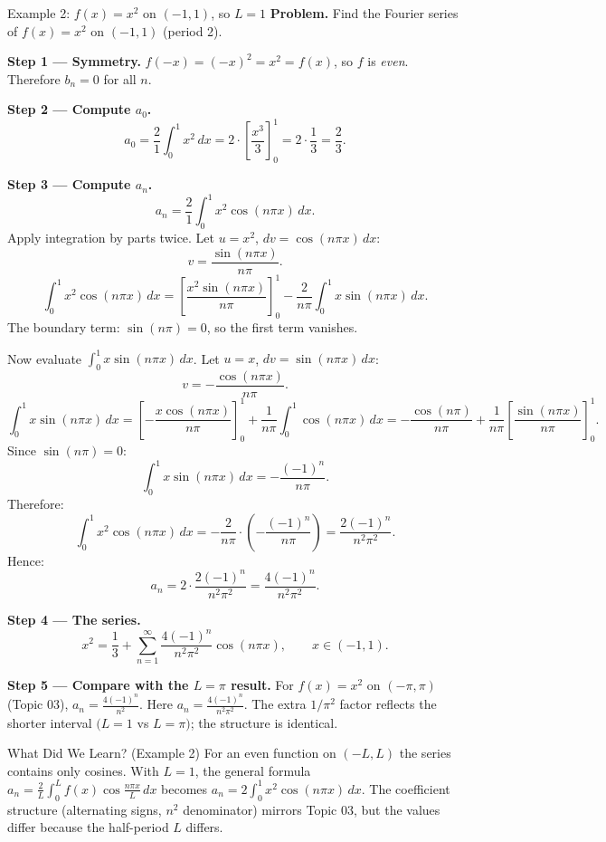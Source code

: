 \documentclass[12pt,a4paper]{article}
\begin{document}
\begin{infobox}{Example 2: $f(x) = x^2$ on $(-1, 1)$, so $L = 1$}
\textbf{Problem.} Find the Fourier series of $f(x) = x^2$ on $(-1, 1)$ (period 2).

\medskip
\textbf{Step 1 --- Symmetry.}
$f(-x) = (-x)^2 = x^2 = f(x)$, so $f$ is \emph{even}.
Therefore $b_n = 0$ for all $n$.

\textbf{Step 2 --- Compute $a_0$.}
\[
a_0 = \frac{2}{1}\int_0^1 x^2\,dx = 2\cdot\left[\frac{x^3}{3}\right]_0^1 = 2\cdot\frac{1}{3} = \frac{2}{3}.
\]

\textbf{Step 3 --- Compute $a_n$.}
\[
a_n = \frac{2}{1}\int_0^1 x^2\cos(n\pi x)\,dx.
\]
Apply integration by parts twice. Let $u = x^2$, $dv = \cos(n\pi x)\,dx$:
\[
v = \frac{\sin(n\pi x)}{n\pi}.
\]
\[
\int_0^1 x^2\cos(n\pi x)\,dx
= \left[\frac{x^2\sin(n\pi x)}{n\pi}\right]_0^1
  - \frac{2}{n\pi}\int_0^1 x\sin(n\pi x)\,dx.
\]
The boundary term: $\sin(n\pi) = 0$, so the first term vanishes.

Now evaluate $\int_0^1 x\sin(n\pi x)\,dx$. Let $u = x$, $dv = \sin(n\pi x)\,dx$:
\[
v = -\frac{\cos(n\pi x)}{n\pi}.
\]
\[
\int_0^1 x\sin(n\pi x)\,dx
= \left[-\frac{x\cos(n\pi x)}{n\pi}\right]_0^1
  + \frac{1}{n\pi}\int_0^1\cos(n\pi x)\,dx
= -\frac{\cos(n\pi)}{n\pi} + \frac{1}{n\pi}\left[\frac{\sin(n\pi x)}{n\pi}\right]_0^1.
\]
Since $\sin(n\pi) = 0$:
\[
\int_0^1 x\sin(n\pi x)\,dx = -\frac{(-1)^n}{n\pi}.
\]
Therefore:
\[
\int_0^1 x^2\cos(n\pi x)\,dx = -\frac{2}{n\pi}\cdot\left(-\frac{(-1)^n}{n\pi}\right)
= \frac{2(-1)^n}{n^2\pi^2}.
\]
Hence:
\[
a_n = 2\cdot\frac{2(-1)^n}{n^2\pi^2} = \frac{4(-1)^n}{n^2\pi^2}.
\]

\textbf{Step 4 --- The series.}
\[
x^2 = \frac{1}{3} + \sum_{n=1}^{\infty}\frac{4(-1)^n}{n^2\pi^2}\cos(n\pi x), \qquad x \in (-1,1).
\]

\textbf{Step 5 --- Compare with the $L = \pi$ result.}
For $f(x) = x^2$ on $(-\pi,\pi)$ (Topic 03), $a_n = \frac{4(-1)^n}{n^2}$.
Here $a_n = \frac{4(-1)^n}{n^2\pi^2}$.
The extra $1/\pi^2$ factor reflects the shorter interval $(L=1$ vs $L=\pi)$; the structure is identical.
\end{infobox}

\begin{learnbox}{What Did We Learn? (Example 2)}
For an even function on $(-L,L)$ the series contains only cosines.
With $L=1$, the general formula $a_n = \frac{2}{L}\int_0^L f(x)\cos\frac{n\pi x}{L}\,dx$ becomes $a_n = 2\int_0^1 x^2\cos(n\pi x)\,dx$.
The coefficient structure (alternating signs, $n^2$ denominator) mirrors Topic 03, but the values differ because the half-period $L$ differs.
\end{learnbox}
\end{document}
